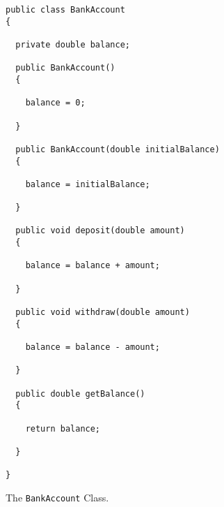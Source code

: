 \documentclass[12pt]{article}
\begin{document}
\begin{enumerate}







\newpage

\begin{figure}[t]

\footnotesize{
\begin{verbatim}
public class BankAccount
{

  private double balance;

  public BankAccount()
  {

    balance = 0;

  }

  public BankAccount(double initialBalance)
  {

    balance = initialBalance;

  }

  public void deposit(double amount)
  {

    balance = balance + amount;

  }

  public void withdraw(double amount)
  {

    balance = balance - amount;

  }

  public double getBalance()
  {

    return balance;

  }

}
\end{verbatim}
}
\caption{The {\tt BankAccount} Class.}
\label{BankAccount}
\end{figure}

\begin{figure}[t]


\end{figure}
\end{enumerate}
\end{document}
